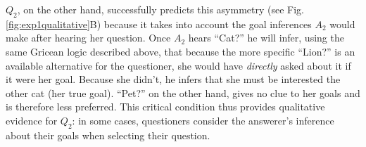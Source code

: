 \documentclass[11pt, floatsintext]{apa6}
\begin{document}
$Q_2$, on the other hand, successfully predicts this asymmetry (see Fig. \ref{fig:exp1qualitative}B) because it takes into account the goal inferences $A_2$ would make after hearing her question. 
Once $A_2$ hears ``Cat?'' he will infer, using the same Gricean logic described above, that because the more specific ``Lion?'' is an available alternative for the questioner, she would have \emph{directly} asked about it if it were her goal. 
Because she didn't, he infers that she must be interested the other cat (her true goal). 
``Pet?'' on the other hand, gives no clue to her goals and is therefore less preferred. 
This critical condition thus provides qualitative evidence for $Q_2$: in some cases, questioners consider the answerer's inference about their goals when selecting their question. 

%



%
\end{document}

